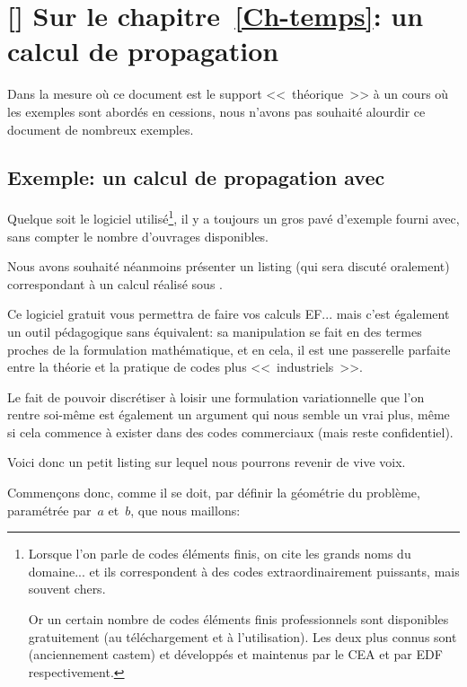 \ifVersionAvecExemplesSepares
  \chapter{[\freefem] Sur le chapitre~\ref{Ch-temps}: un calcul de propagation}

  Dans la mesure où ce document est le support <<~théorique~>> à un cours
  où les exemples sont abordés en cessions, nous n'avons pas souhaité alourdir
  ce document de nombreux exemples.
\else
  \section{Exemple: un calcul de propagation avec \freefem}
\fi


\medskip
Quelque soit le logiciel utilisé\footnote{%
Lorsque l'on parle de codes éléments finis, on cite les grands noms du domaine... et ils correspondent à des
codes extraordinairement puissants, mais souvent chers.

Or un certain nombre de codes éléments finis professionnels sont disponibles gratuitement (au téléchargement
et à l'utilisation).
Les deux plus connus sont \castem (anciennement castem) et \aster développés et maintenus
par le CEA et par EDF respectivement.%
}, il y a toujours un gros pavé d'exemple fourni avec,
sans compter le nombre d'ouvrages disponibles.

\medskip
Nous avons souhaité néanmoins présenter un listing (qui sera discuté oralement)
correspondant à un calcul réalisé sous \freefem.

Ce logiciel gratuit vous permettra de faire vos calculs EF... mais c'est également un outil 
pédagogique sans équivalent: sa manipulation se fait en des termes proches de la
formulation mathématique, et en cela, il est une passerelle parfaite entre la théorie
et la pratique de codes plus <<~industriels~>>.

Le fait de pouvoir discrétiser à loisir une formulation variationnelle que l'on rentre
soi-même est également un argument qui nous semble un vrai plus, même si
cela commence à exister dans des codes commerciaux (mais reste confidentiel).

\medskip
Voici donc un petit listing sur lequel nous pourrons revenir de vive voix.

Commençons donc, comme il se doit, par définir la géométrie du problème, paramétrée
par~$a$ et~$b$, que nous maillons:


